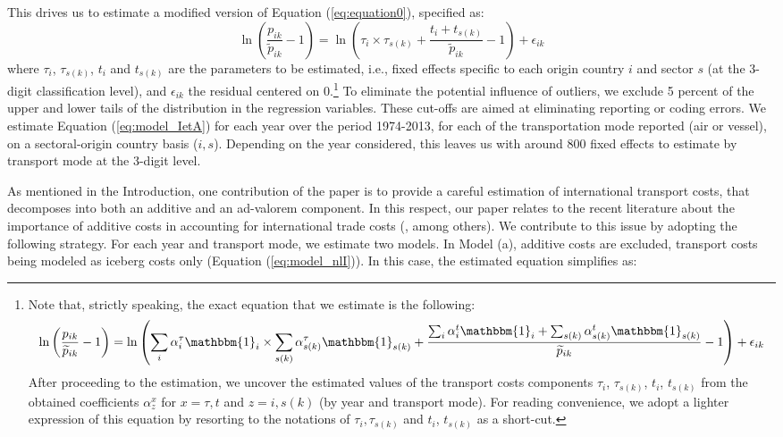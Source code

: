 \documentclass[a4paper,11pt]{article}
\begin{document}
This drives us to estimate a modified version of Equation (\ref{eq:equation0}), specified as:
\begin{equation}
\ln\left(\frac{p_{ik}}{\widetilde{p}_{ik}}-1 \right)= \ln \left(\tau_{i} \times \tau_{s(k)}+\frac{t_{i} + t_{s(k)}}{\widetilde{p}_{ik}}-1 \right) + \epsilon_{ik} \label{eq:model_IetA}
\end{equation}
where $\tau_{i}$, $\tau_{s(k)}$, $t_{i}$ and $t_{s(k)}$ are the parameters to be estimated, i.e., fixed effects specific to each origin country $i$ and sector $s$ (at the 3-digit classification level), and $\epsilon_{ik}$ the residual centered on 0.\footnote{Note that, strictly speaking, the exact equation that we estimate is the following:
$$\ln\left(\frac{p_{ik}}{\widetilde{p}_{ik}}-1 \right)= \ln \left(\sum_i \alpha_i^\tau \mathbbm{1}_i \times \sum_{s(k)}\alpha_{s(k)}^\tau \mathbbm{1}_{s(k)}+ \frac{\sum_i\alpha_i^t\mathbbm{1}_i + \sum_{s(k)}\alpha^t_{s(k)}\mathbbm{1}_{s(k)}}{\widetilde{p}_{ik}}-1\right)+\epsilon_{ik} $$
After proceeding to the estimation, we uncover the estimated values of the transport costs components $\tau_{i}$, $\tau_{s(k)}$, $t_{i}$, $t_{s(k)}$ from the obtained coefficients $\alpha^{x}_{z}$ for $x=\tau,t$ and $z=i,s(k)$ (by year and transport mode).
For reading convenience, we adopt a lighter expression of this equation by resorting to the notations of $\tau_i,\tau_{s(k)}$ and $t_i$, $t_{s(k)}$ as a short-cut.}  To eliminate the potential influence of outliers, we exclude 5 percent of the upper and lower tails of the distribution in the regression variables.
These cut-offs are aimed at eliminating reporting or coding errors.
We estimate Equation (\ref{eq:model_IetA}) for each year over the period 1974-2013, for each of the transportation mode reported (air or vessel), on a sectoral-origin country basis ($i,s$).
Depending on the year considered, this leaves us with around 800 fixed effects to estimate by transport mode at the 3-digit level.
  \medskip


As mentioned in the Introduction, one contribution of the paper is to provide a careful estimation of international transport costs, that decomposes into both an additive and an ad-valorem component.
In this respect, our paper relates to the recent literature about the importance of additive costs in accounting for international trade costs (\citealp{Irrazabal_2015}, among others).
We contribute to this issue by adopting the following strategy.
For each year and transport mode, we estimate two models.
In Model (a), additive costs are excluded, transport costs being modeled as iceberg costs only (Equation (\ref{eq:model_nlI})).
In this case, the estimated equation simplifies as:
\end{document}
